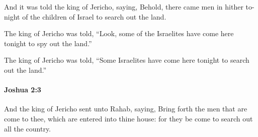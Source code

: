 			\begin{versebox}
					\item[BHS] 
					\item[ASV] And it was told the king of Jericho, saying, Behold, there came men in hither to-night of the children of Israel to search out the land.
					\item[NIV] The king of Jericho was told, “Look, some of the Israelites have come here tonight to spy out the land.”
					\item[NRSV] The king of Jericho was told, “Some Israelites have come here tonight to search out the land.”
			\end{versebox}

		\paragraph{Joshua 2:3} %
			\label{JOSHUA-2-3}

			And the king of Jericho sent unto Rahab, saying, Bring forth the men that are come to thee, which are entered into thine house: for they be come to search out all the country.

